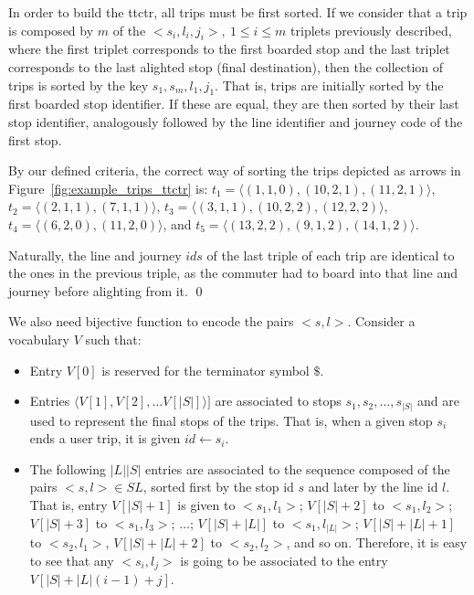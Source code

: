     In order to build the \gls{ttctr}, all trips must be first sorted. If we consider that a trip is composed by $m$ of the $<s_i,l_i,j_i>,~1\leq i\leq m$ triplets previously described, where the first triplet corresponds to the first boarded stop and the last triplet corresponds to the last alighted stop (final destination), then the collection of trips is sorted by the key $s_1,s_m,l_1,j_1$. That is, trips are initially sorted by the first boarded stop identifier. If these are equal, they are then sorted by their last stop identifier, analogously followed by the line identifier and journey code of the first stop. 
    
    \begin{example}
    	By our defined criteria, the correct way of sorting the trips depicted as arrows in Figure~\ref{fig:example_trips_ttctr} is: 
    	$t_1 = \langle (1,1,0), (10,2,1), (11,2,1)  \rangle$, 
    	$t_2 = \langle (2,1,1), (7,1,1) \rangle$, 
    	$t_3 = \langle (3,1,1), (10,2,2), (12,2,2) \rangle$, 
    	$t_4 = \langle (6,2,0),(11,2,0) \rangle$, and %
    	$t_5 = \langle (13,2,2), (9,1,2), (14,1,2) \rangle$.  
    	
    	Naturally, the line and journey $ids$ of the last triple of each trip are identical to the ones in the previous triple, as the commuter had to board into that line and journey before alighting from it.
    	\qed	\label{ex:trips}
    \end{example}
    
    We also need bijective function to encode the pairs $<s,l>$. Consider a vocabulary $V$ such that:
    \begin{itemize}
    	\item Entry $V[0]$ is reserved for the terminator symbol $\$$.
    	\item Entries $\langle V[1],V[2], \dots V[|S|]\rangle]$ are associated to stops $s_1,s_2,\dots, s_{|S|}$ and are used to represent the final stops of the trips. That is, when a given stop $s_i$ ends a user trip, it is given $id \leftarrow s_i$.
    	\item The following $|L||S|$ entries are associated to the sequence composed of the pairs $<s,l> \in S L$, sorted first by the stop id $s$ and later by the line id $l$. That is, entry $V[|S|+1]$ is given to $<s_1,l_1>$; $V[|S|+2]$ to $<s_1,l_2>$; $V[|S|+3]$ to $<s_1,l_3>$; $\dots$; $V[|S|+|L|]$ to $<s_1,l_{|L|}>$;  $V[|S|+|L|+1]$ to $<s_2, l_1>$, $V[|S|+|L|+2]$ to $<s_2, l_2>$, and so on. Therefore, it is easy to see that any $<s_i,l_j>$ is going to be associated to the entry $V[|S|+ |L|(i-1) + j]$.
    \end{itemize}
    
